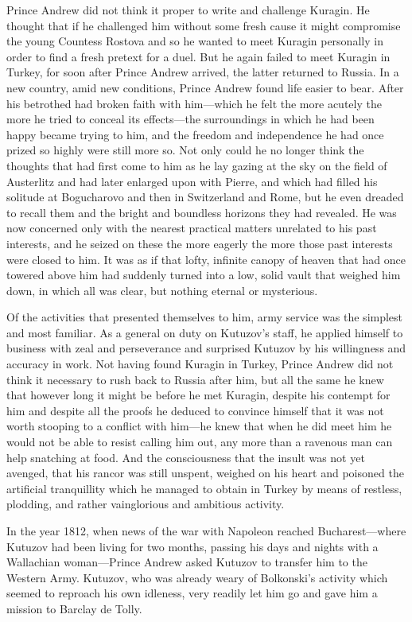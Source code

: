 Prince Andrew did not think it proper to write and challenge
Kuragin. He thought that if he challenged him without some fresh
cause it might compromise the young Countess Rostova and so he
wanted to meet Kuragin personally in order to find a fresh
pretext for a duel. But he again failed to meet Kuragin in
Turkey, for soon after Prince Andrew arrived, the latter returned
to Russia. In a new country, amid new conditions, Prince Andrew
found life easier to bear. After his betrothed had broken faith
with him---which he felt the more acutely the more he tried to
conceal its effects---the surroundings in which he had been happy
became trying to him, and the freedom and independence he had
once prized so highly were still more so. Not only could he no
longer think the thoughts that had first come to him as he lay
gazing at the sky on the field of Austerlitz and had later
enlarged upon with Pierre, and which had filled his solitude at
Bogucharovo and then in Switzerland and Rome, but he even dreaded
to recall them and the bright and boundless horizons they had
revealed. He was now concerned only with the nearest practical
matters unrelated to his past interests, and he seized on these
the more eagerly the more those past interests were closed to
him. It was as if that lofty, infinite canopy of heaven that had
once towered above him had suddenly turned into a low, solid
vault that weighed him down, in which all was clear, but nothing
eternal or mysterious.

Of the activities that presented themselves to him, army service
was the simplest and most familiar. As a general on duty on
Kutuzov's staff, he applied himself to business with zeal and
perseverance and surprised Kutuzov by his willingness and
accuracy in work. Not having found Kuragin in Turkey, Prince
Andrew did not think it necessary to rush back to Russia after
him, but all the same he knew that however long it might be
before he met Kuragin, despite his contempt for him and despite
all the proofs he deduced to convince himself that it was not
worth stooping to a conflict with him---he knew that when he did
meet him he would not be able to resist calling him out, any more
than a ravenous man can help snatching at food. And the
consciousness that the insult was not yet avenged, that his
rancor was still unspent, weighed on his heart and poisoned the
artificial tranquillity which he managed to obtain in Turkey by
means of restless, plodding, and rather vainglorious and
ambitious activity.

In the year 1812, when news of the war with Napoleon reached
Bucharest---where Kutuzov had been living for two months, passing
his days and nights with a Wallachian woman---Prince Andrew asked
Kutuzov to transfer him to the Western Army. Kutuzov, who was
already weary of Bolkonski's activity which seemed to reproach
his own idleness, very readily let him go and gave him a mission
to Barclay de Tolly.

